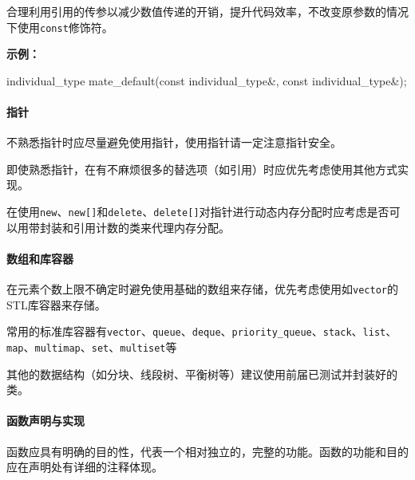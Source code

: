 \documentclass[
]{article}
\newenvironment{Shaded}{}{}
\newcommand{\AttributeTok}[1]{\textcolor[rgb]{0.49,0.56,0.16}{#1}}
\newcommand{\DataTypeTok}[1]{\textcolor[rgb]{0.56,0.13,0.00}{#1}}
\newcommand{\NormalTok}[1]{#1}
\newcommand{\OperatorTok}[1]{\textcolor[rgb]{0.40,0.40,0.40}{#1}}
\begin{document}
合理利用引用的传参以减少数值传递的开销，提升代码效率，不改变原参数的情况下使用\texttt{const}修饰符。

\textbf{示例：}

\begin{Shaded}
\begin{Highlighting}[]
\DataTypeTok{individual\_type}\NormalTok{ mate\_default}\OperatorTok{(}\AttributeTok{const} \DataTypeTok{individual\_type}\OperatorTok{\&,} \AttributeTok{const} \DataTypeTok{individual\_type}\OperatorTok{\&);}
\end{Highlighting}
\end{Shaded}

\hypertarget{ux6307ux9488}{%
\paragraph{指针}\label{ux6307ux9488}}

不熟悉指针时应尽量避免使用指针，使用指针请一定注意指针安全。

即使熟悉指针，在有不麻烦很多的替选项（如引用）时应优先考虑使用其他方式实现。

在使用\texttt{new}、\texttt{new{[}{]}}和\texttt{delete}、\texttt{delete{[}{]}}对指针进行动态内存分配时应考虑是否可以用带封装和引用计数的类来代理内存分配。

\hypertarget{ux6570ux7ec4ux548cux5e93ux5bb9ux5668}{%
\paragraph{数组和库容器}\label{ux6570ux7ec4ux548cux5e93ux5bb9ux5668}}

在元素个数上限不确定时避免使用基础的数组来存储，优先考虑使用如\texttt{vector}的STL库容器来存储。

常用的标准库容器有\texttt{vector}、\texttt{queue}、\texttt{deque}、\texttt{priority\_queue}、\texttt{stack}、\texttt{list}、\texttt{map}、\texttt{multimap}、\texttt{set}、\texttt{multiset}等

其他的数据结构（如分块、线段树、平衡树等）建议使用前届已测试并封装好的类。

\hypertarget{ux51fdux6570ux58f0ux660eux4e0eux5b9eux73b0}{%
\paragraph{函数声明与实现}\label{ux51fdux6570ux58f0ux660eux4e0eux5b9eux73b0}}

函数应具有明确的目的性，代表一个相对独立的，完整的功能。函数的功能和目的应在声明处有详细的注释体现。
\end{document}
